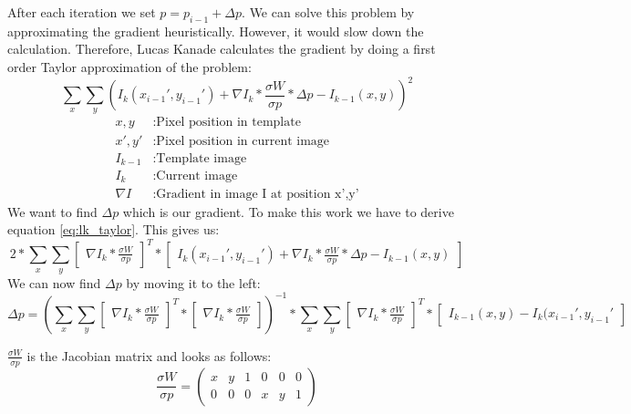 \documentclass[11pt,a4paper,titlepage,oneside]{report}
\begin{document}
After each iteration we set $p=p_{i-1}+\Delta p$. We can solve this problem by approximating the gradient heuristically. However, it would slow down the calculation. Therefore, Lucas Kanade calculates the gradient by doing a first order Taylor approximation of the problem:
\begin{equation}\label{eq:lk_taylor}
	\sum_x\sum_y(I_{k}(x_{i-1}',y_{i-1}')+\nabla I_{k}*\frac{\sigma W}{\sigma p}*\Delta p-I_{k-1}(x,y))^2
\end{equation}
\begin{align*}
	x,y				&:	\text{Pixel position in template}\\
	x',y'			&:	\text{Pixel position in current image}\\
	I_{k-1}		&:	\text{Template image}\\
	I_{k}			&:	\text{Current image}\\
	\nabla I	&:	\text{Gradient in image I at position x',y'}
\end{align*}
We want to find $\Delta p$ which is our gradient. To make this work we have to derive equation \ref{eq:lk_taylor}. This gives us:
\begin{equation}
	2*\sum_x\sum_y\begin{bmatrix}\nabla I_{k}*\frac{\sigma W}{\sigma p}\end{bmatrix}^T*\begin{bmatrix}I_{k}(x_{i-1}',y_{i-1}')+\nabla I_{k}*\frac{\sigma W}{\sigma p}*\Delta p-I_{k-1}(x,y)\end{bmatrix}
\end{equation}
We can now find $\Delta p$ by moving it to the left:
\begin{equation}\label{eq:lk_dp}
	\Delta p=(\sum_x\sum_y\begin{bmatrix}\nabla I_{k}*\frac{\sigma W}{\sigma p}\end{bmatrix}^T*\begin{bmatrix}\nabla I_{k}*\frac{\sigma W}{\sigma p}\end{bmatrix})^{-1}
	*\sum_x\sum_y\begin{bmatrix}\nabla I_{k}*\frac{\sigma W}{\sigma p}\end{bmatrix}^T*\begin{bmatrix}I_{k-1}(x,y) - I_{k}(x_{i-1}',y_{i-1}'\end{bmatrix}
\end{equation}

$\frac{\sigma W}{\sigma p}$ is the Jacobian matrix and looks as follows:
\begin{equation}
	\frac{\sigma W}{\sigma p}=
	\begin{pmatrix}
		x & y & 1 & 0 & 0 & 0 \\
		0 & 0 & 0 & x & y & 1
	\end{pmatrix}
\end{equation}
\end{document}
